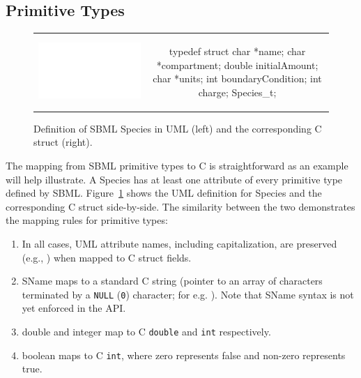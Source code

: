 \documentclass{cekmanual}
\begin{document}
\subsection{Primitive Types}


\begin{figure}[t]
  \begin{tabular}{m{8.5cm}c}
    \includegraphics[scale=0.68]{species}
    &
    \begin{example}
typedef struct
{
  char    *name;
  char    *compartment;
  double  initialAmount;
  char    *units;
  int     boundaryCondition;
  int     charge;
} Species_t;
    \end{example}\\
  \end{tabular}
  \caption{Definition of SBML Species in UML (left) and the
  corresponding  C struct (right).}
  \label{fig:species-uml-and-c}
\end{figure}

The mapping from SBML primitive types to C is straightforward as an
example will help illustrate.  A Species has at least one attribute of
every primitive type defined by SBML.
Figure~\ref{fig:species-uml-and-c} shows the UML definition for
Species and the corresponding C struct side-by-side.  The similarity
between the two demonstrates the mapping rules for primitive types:

\begin{enumerate}

  \item In all cases, UML attribute names, including capitalization,
  are preserved (e.g., ) when mapped to C
  struct fields.

  \item SName maps to a standard C string (pointer to an array of
  characters terminated by a \texttt{NULL} (\texttt{0}) character; for
  e.g. ).  Note that SName syntax is not yet
  enforced in the API.

  \item double and integer map to C \texttt{double} and \texttt{int}
  respectively.

  \item boolean maps to C \texttt{int}, where zero represents false
  and non-zero represents true.

\end{enumerate}
\end{document}
